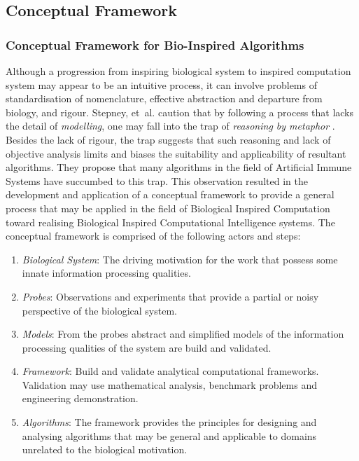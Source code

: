 \subsection{Conceptual Framework}
\label{sec:background:methodology:cf}

%
%
\subsubsection{Conceptual Framework for Bio-Inspired Algorithms}
\label{subsec:methodology:conceptual}
Although a progression from inspiring biological system to inspired computation system may appear to be an intuitive process, it can involve problems of standardisation of nomenclature, effective abstraction and departure from biology, and rigour. Stepney, et~al. caution that by following a process that lacks the detail of \emph{modelling}, one may fall into the trap of \emph{reasoning by metaphor} \cite{Twycross2005, Stepney2004, Stepney2005}. Besides the lack of rigour, the trap suggests that such reasoning and lack of objective analysis limits and biases the suitability and applicability of resultant algorithms. They propose that many algorithms in the field of Artificial Immune Systems have succumbed to this trap. This observation resulted in the development and application of a conceptual framework to provide a general process that may be applied in the field of Biological Inspired Computation toward realising Biological Inspired Computational Intelligence systems. The conceptual framework is comprised of the following actors and steps:
\begin{enumerate}
	\item \emph{Biological System}: The driving motivation for the work that possess some innate information processing qualities. 
	\item \emph{Probes}: Observations and experiments that provide a partial or noisy perspective of the biological system.
	\item \emph{Models}: From the probes abstract and simplified models of the information processing qualities of the system are build and validated.
	\item \emph{Framework}: Build and validate analytical computational frameworks. Validation may use mathematical analysis, benchmark problems and engineering demonstration.
	\item \emph{Algorithms}: The framework provides the principles for designing and analysing algorithms that may be general and applicable to domains unrelated to the biological motivation.
\end{enumerate}

